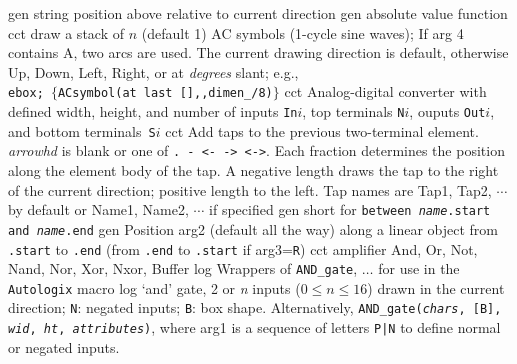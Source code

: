 %
%
  {gen}%
  {string position above relative to current direction}%
%
  {gen}%
  {absolute value function}%
%
  {cct}%
  {draw a stack of $n$ (default 1) AC symbols
   (1-cycle sine waves); If arg 4 contains A, two arcs
   are used.  The current drawing direction is default, otherwise Up, Down,
   Left, Right, or at {\sl degrees} slant;  e.g.,\\ 
   {\tt ebox; $\lbrace$ACsymbol(at last [],{,}dimen\_/8)$\rbrace$}}%
%
  {cct}%
  {Analog-digital converter with defined width, height, and number of
   inputs {\tt In$i$}, top terminals {\tt N$i$}, ouputs {\tt Out$i$},
    and bottom terminals~{\tt S$i$}}%
%
  {cct}%
  {Add taps to the previous two-terminal element.
   {\sl arrowhd} is blank or one of {\tt . - <- -> <->}.
   Each fraction determines the position along the element body of the tap.
   A negative length draws the tap to the right of the current
   direction; positive length to the left.
   Tap names are Tap1, Tap2, $\cdots$ by default  or
   Name1, Name2, $\cdots$ if specified 
   }%
%
  {gen}%
  {short for {\tt between {\sl name}.start and {\sl name}.end}}%
%
  {gen}%
  {Position arg2 (default all the way) along a linear object
   from {\tt .start} to {\tt .end}%
   (from {\tt .end} to {\tt .start} if arg3={\tt R}) }%
%
  {cct}%
  {amplifier}%
%
 {And, Or, Not, Nand, Nor, Xor, Nxor, Buffer}{}%
  {log}%
  {Wrappers of {\tt AND\_gate}, $\ldots$ for use in the {\tt Autologix}%
   macro}%
%
  {log}%
  {`and' gate, 2 or {\sl n\/} inputs ($0 \leq n \leq 16$) drawn in the
   current direction;
   {\tt N}: negated inputs; {\tt B}: box shape.
   Alternatively, {\tt AND\_gate({\sl chars}, [B], {\sl wid},
    {\sl ht}, {\sl attributes})}, where
   arg1 is a sequence of letters {\tt P|N} to define
   normal or negated inputs.
    }%
%
